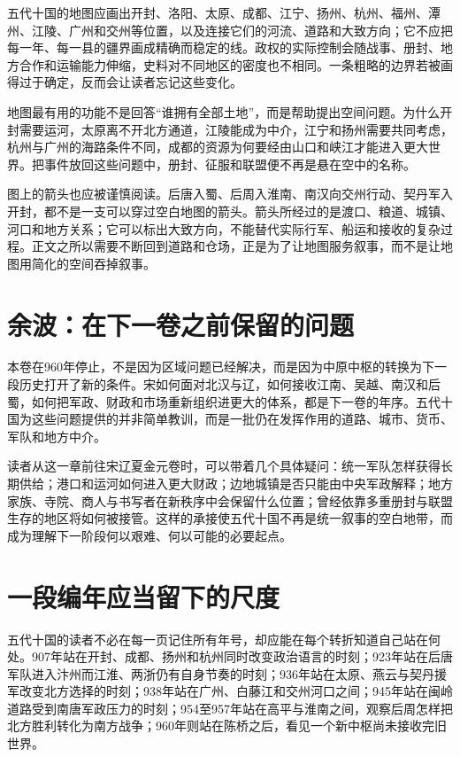 五代十国的地图应画出开封、洛阳、太原、成都、江宁、扬州、杭州、福州、潭州、江陵、广州和交州等位置，以及连接它们的河流、道路和大致方向；它不应把每一年、每一县的疆界画成精确而稳定的线。政权的实际控制会随战事、册封、地方合作和运输能力伸缩，史料对不同地区的密度也不相同。一条粗略的边界若被画得过于确定，反而会让读者忘记这些变化。

地图最有用的功能不是回答“谁拥有全部土地”，而是帮助提出空间问题。为什么开封需要运河，太原离不开北方通道，江陵能成为中介，江宁和扬州需要共同考虑，杭州与广州的海路条件不同，成都的资源为何要经由山口和峡江才能进入更大世界。把事件放回这些问题中，册封、征服和联盟便不再是悬在空中的名称。

图上的箭头也应被谨慎阅读。后唐入蜀、后周入淮南、南汉向交州行动、契丹军入开封，都不是一支可以穿过空白地图的箭头。箭头所经过的是渡口、粮道、城镇、河口和地方关系；它可以标出大致方向，不能替代实际行军、船运和接收的复杂过程。正文之所以需要不断回到道路和仓场，正是为了让地图服务叙事，而不是让地图用简化的空间吞掉叙事。

\section{余波：在下一卷之前保留的问题}

本卷在960年停止，不是因为区域问题已经解决，而是因为中原中枢的转换为下一段历史打开了新的条件。宋如何面对北汉与辽，如何接收江南、吴越、南汉和后蜀，如何把军政、财政和市场重新组织进更大的体系，都是下一卷的年序。五代十国为这些问题提供的并非简单教训，而是一批仍在发挥作用的道路、城市、货币、军队和地方中介。

读者从这一章前往宋辽夏金元卷时，可以带着几个具体疑问：统一军队怎样获得长期供给；港口和运河如何进入更大财政；边地城镇是否只能由中央军政解释；地方家族、寺院、商人与书写者在新秩序中会保留什么位置；曾经依靠多重册封与联盟生存的地区将如何被接管。这样的承接使五代十国不再是统一叙事的空白地带，而成为理解下一阶段何以艰难、何以可能的必要起点。

\section{一段编年应当留下的尺度}

五代十国的读者不必在每一页记住所有年号，却应能在每个转折知道自己站在何处。907年站在开封、成都、扬州和杭州同时改变政治语言的时刻；923年站在后唐军队进入汴州而江淮、两浙仍有自身节奏的时刻；936年站在太原、燕云与契丹援军改变北方选择的时刻；938年站在广州、白藤江和交州河口之间；945年站在闽岭道路受到南唐军政压力的时刻；954至957年站在高平与淮南之间，观察后周怎样把北方胜利转化为南方战争；960年则站在陈桥之后，看见一个新中枢尚未接收完旧世界。

